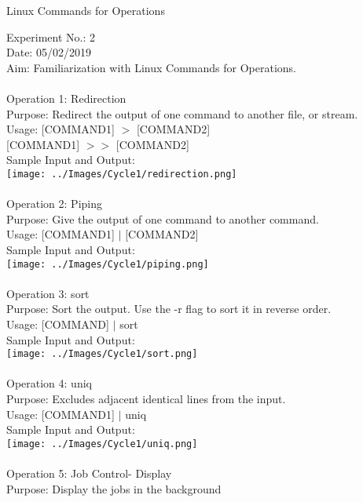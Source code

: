 \documentclass[10pt,a4paper]{report}
\begin{document}
\pagebreak

\begin{center}
\begin{Large}
Linux Commands for Operations
\end{Large}
\end{center}
Experiment No.: 2\\
Date: 05/02/2019\\
Aim: Familiarization with Linux Commands for Operations.\\
\\
Operation 1: Redirection\\
Purpose: Redirect the output of one command to another file, or stream.\\
Usage: [COMMAND1] $>$ [COMMAND2]\\
{[COMMAND1]} $>>$ [COMMAND2]\\
Sample Input and Output:\\
\texttt{[image: ../Images/Cycle1/redirection.png]}\\
\\
Operation 2: Piping\\
Purpose: Give the output of one command to another command.\\
Usage: [COMMAND1] $|$ [COMMAND2]\\
Sample Input and Output:\\
\texttt{[image: ../Images/Cycle1/piping.png]}\\
\pagebreak
\\
Operation 3: sort\\
Purpose: Sort the output. Use the -r flag to sort it in reverse order.\\
Usage: [COMMAND] $|$ sort\\
Sample Input and Output:\\
\texttt{[image: ../Images/Cycle1/sort.png]}\\
\\
Operation 4: uniq\\
Purpose: Excludes adjacent identical lines from the input.\\
Usage: [COMMAND1] $|$ uniq\\
Sample Input and Output:\\
\texttt{[image: ../Images/Cycle1/uniq.png]}\\
\pagebreak
\\
Operation 5: Job Control- Display\\
Purpose: Display the jobs in the background\\
\end{document}
